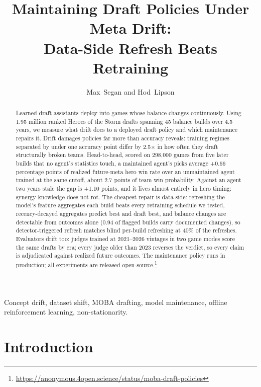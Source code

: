 \documentclass[journal]{IEEEtran}
\newif\ifanonymous
\newcommand{\repourl}{\url{https://anonymous.4open.science/status/moba-draft-policies}}
\newcommand{\repourl}{\url{https://github.com/maxsegan/moba-draft-policies}}
\begin{document}
\title{Maintaining Draft Policies Under Meta Drift:\\ Data-Side Refresh Beats Retraining}
\ifanonymous
\author{Anonymous Authors}
\else
\author{Max~Segan and Hod~Lipson}
\fi
\maketitle

\begin{abstract}
Learned draft assistants deploy into games whose balance changes
continuously. Using 1.95 million ranked Heroes of the Storm drafts
spanning 45 balance builds over 4.5 years, we measure what drift does to
a deployed draft policy and which maintenance repairs it. Drift damages
policies far more than accuracy reveals: training regimes separated by
under one accuracy point differ by 2.5$\times$ in how often they draft
structurally broken teams. Head-to-head, scored on 298{,}000 games from
five later builds that no agent's statistics touch, a maintained agent's
picks average +0.66 percentage points of realized future-meta hero win
rate over an unmaintained agent trained at the same cutoff, about 2.7
points of team win probability. Against an agent two years stale the gap
is +1.10 points, and it lives almost entirely in hero timing: synergy
knowledge does not rot. The cheapest repair is data-side: refreshing the
model's feature aggregates each build beats every retraining schedule we
tested, recency-decayed aggregates predict best and draft best, and
balance changes are detectable from outcomes alone (0.94 of flagged
builds carry documented changes), so detector-triggered refresh matches
blind per-build refreshing at 40\% of the refreshes. Evaluators drift
too: judges trained at 2021--2026 vintages in two game modes score the
same drafts by era; every judge older than 2023 reverses the verdict, so
every claim is adjudicated against realized future outcomes.
The maintenance policy runs in production; all experiments are released
open-source.\footnote{\repourl}
\end{abstract}

\begin{IEEEkeywords}
Concept drift, dataset shift, MOBA drafting, model maintenance, offline
reinforcement learning, non-stationarity.
\end{IEEEkeywords}

\section{Introduction}
\end{document}
